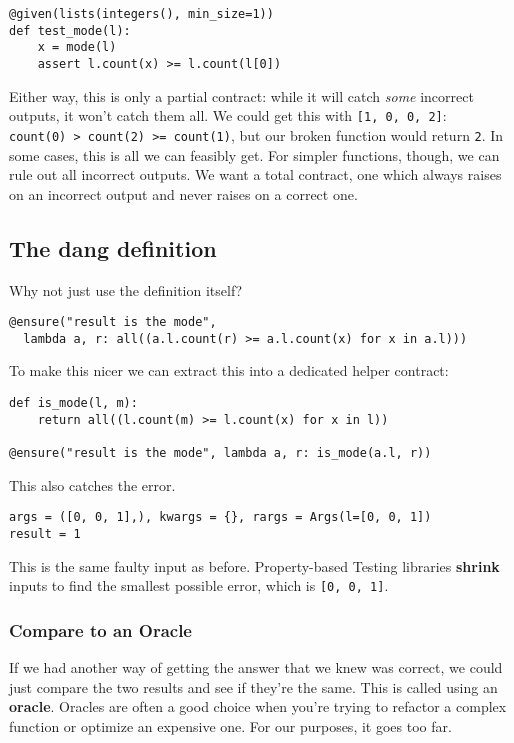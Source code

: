 \begin{verbatim}
@given(lists(integers(), min_size=1))
def test_mode(l):
    x = mode(l)
    assert l.count(x) >= l.count(l[0])
\end{verbatim}
Either way, this is only a partial contract: while it will catch
\emph{some} incorrect outputs, it won't catch them all. We could get
this with \texttt{{[}1,\ 0,\ 0,\ 2{]}}:
\texttt{count(0)\ \textgreater{}\ count(2)\ \textgreater{}=\ count(1)},
but our broken function would return \texttt{2}. In some cases, this is
all we can feasibly get. For simpler functions, though, we can rule out
all incorrect outputs. We want a total contract, one which always raises
on an incorrect output and never raises on a correct one.

\subsection{The dang definition}
\label{the-dang-definition}

Why not just use the definition itself?

\begin{verbatim}
@ensure("result is the mode", 
  lambda a, r: all((a.l.count(r) >= a.l.count(x) for x in a.l)))
\end{verbatim}
To make this nicer we can extract this into a dedicated helper contract:

\begin{verbatim}
def is_mode(l, m):
    return all((l.count(m) >= l.count(x) for x in l))

@ensure("result is the mode", lambda a, r: is_mode(a.l, r))
\end{verbatim}
This also catches the error.

\begin{verbatim}
args = ([0, 0, 1],), kwargs = {}, rargs = Args(l=[0, 0, 1])
result = 1
\end{verbatim}
This is the same faulty input as before. Property-based Testing
libraries \textbf{shrink} inputs to find the smallest possible error,
which is \texttt{{[}0,\ 0,\ 1{]}}.

\subsubsection{Compare to an Oracle}
\label{compare-to-an-oracle}

If we had another way of getting the answer that we knew was correct, we
could just compare the two results and see if they're the same. This is
called using an \textbf{oracle}. Oracles are often a good choice when
you're trying to refactor a complex function or optimize an expensive
one. For our purposes, it goes too far.


